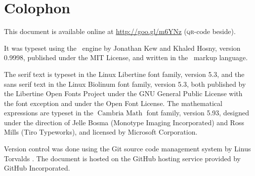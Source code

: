 \documentclass[10pt, a4paper, twoside]{lecturenotes}
\begin{document}
\appendix
\newpage
\section*{Colophon}
This document is available online at \url{http://goo.gl/m6YNz} (\textsc{qr}-code beside).

It was typeset using the \XeTeX\ engine by Jonathan Kew and Khaled Hosny, version 0.9998, published under the MIT
License, and written in the \XeLaTeX\ markup language.

The serif text is typeset in the Linux Libertine font family, version 5.3, and the sans serif text in the \textsf{Linux Biolinum} font family, version 5.3, both published by the Libertine Open Fonts Project under the GNU
General Public License with the font exception and under the Open Font License. The mathematical expressions are typeset in the $\operatorname{Cambria~Math}$ font family, version 5.93, designed under the direction of Jelle Bosma (Monotype Imaging Incorporated) and Ross Mills (Tiro Typeworks), and licensed by Microsoft Corporation.

Version control was done using the Git source code management system by Linus Torvalds . The document is hosted on the GitHub hosting service provided by GitHub Incorporated.
\end{document}

